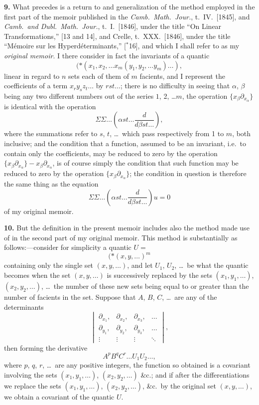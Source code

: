 \documentclass[11pt,a4paper]{book}
\begin{document}
\textbf{9.} What precedes is a return to and generalization of the method employed in the first part of the memoir published in the \textit{Camb.\ Math.\ Jour.}, t.\ IV.\ [1845], and \textit{Camb.\ and Dubl.\ Math.\ Jour.}, t.\ I.\ [1846], under the title ``On Linear Transformations,'' [13 and 14], and Crelle, t.\ XXX.\ [1846], under the title ``M\'{e}moire sur les Hyperd\'{e}terminants,'' [$^{*}$16], and which I shall refer to as my \textit{original memoir}. I there consider in fact the invariants of a quantic
\[
(*\!\!\!\!\!(x_1, x_2, \ldots x_m \!\!\!\!(y_1, y_2, \ldots y_m) \ldots),
\]
linear in regard to $n$ sets each of them of $m$ facients, and I represent the coefficients of a term $x_r y_s z_t \ldots$ by $rst \ldots$; there is no difficulty in seeing that $\alpha$, $\beta$ being any two different numbers out of the series $1$, 2, \ldots $m$, the operation $\{x_{\beta} \partial_{x_{\alpha}}\}$ is identical with the operation
\[
\Sigma\Sigma \ldots \left(\alpha st \ldots \frac{d}{d\beta st \ldots}\right),
\]
where the summations refer to $s$, $t$, \ldots\ which pass respectively from 1 to $m$, both inclusive; and the condition that a function, assumed to be an invariant, i.e.\ to contain only the coefficients, may be reduced to zero by the operation $\{x_{\beta} \partial_{x_{\alpha}}\} - x_{\beta} \partial_{x_{\alpha}}$, is of course simply the condition that such function may be reduced to zero by the operation $\{x_{\beta} \partial_{x_{\alpha}}\}$; the condition in question is therefore the same thing as the equation
\[
\Sigma\Sigma \ldots \left(\alpha st \ldots \frac{d}{d\beta st \ldots}\right) u = 0
\]
of my original memoir.

\newpage
\setcounter{page}{226}

\textbf{10.} But the definition in the present memoir includes also the method made use of in the second part of my original memoir. This method is substantially as follows:---consider for simplicity a quantic $U =$
\[
(*\!\!\!\!\!(x, y, \ldots)^m
\]
containing only the single set $(x, y, \ldots)$, and let $U_1$, $U_2$, \ldots\ be what the quantic becomes when the set $(x, y, \ldots)$ is successively replaced by the sets $(x_1, y_1, \ldots)$, $(x_2, y_2, \ldots)$, \ldots\ the number of these new sets being equal to or greater than the number of facients in the set. Suppose that $A$, $B$, $C$, \ldots\ are any of the determinants
\[
\begin{vmatrix}
\partial_{x_1}, & \partial_{x_2}, & \partial_{x_3}, & \ldots \\
\partial_{y_1}, & \partial_{y_2}, & \partial_{y_3}, & \ldots \\
\vdots & \vdots & \vdots & \ddots
\end{vmatrix},
\]
then forming the derivative
\[
A^p B^q C^r \ldots U_1 U_2 \ldots,
\]
where $p$, $q$, $r$, \ldots\ are any positive integers, the function so obtained is a covariant involving the sets $(x_1, y_1, \ldots)$, $(x_2, y_2, \ldots)$ \&c.; and if after the differentiations we replace the sets $(x_1, y_1, \ldots)$, $(x_2, y_2, \ldots)$, \&c.\ by the original set $(x, y, \ldots)$, we obtain a covariant of the quantic $U$.
\end{document}
